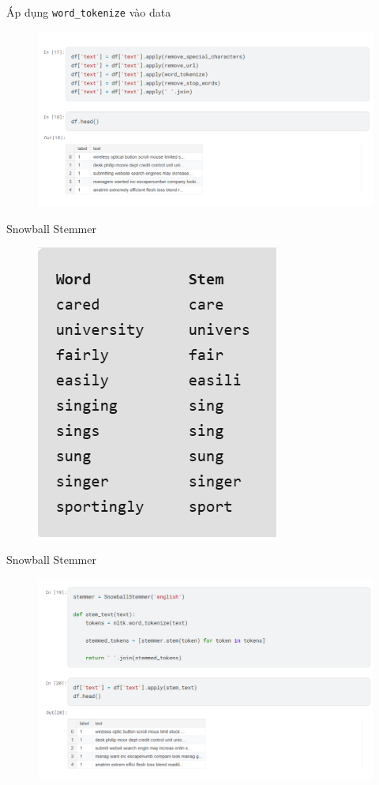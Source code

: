 \documentclass[serif, aspectratio=169]{beamer}
\begin{document}
	\begin{frame}{Áp dụng \texttt{word\_tokenize} vào data}
		\begin{figure}
			\centering
			\includegraphics[width=1\linewidth]{pic/apply-tokenize.png}
			\label{fig:apply-tokenize}
		\end{figure}
	\end{frame}
	
	\begin{frame}{Snowball Stemmer}
		\begin{figure}
			\centering
			\includegraphics[width=0.4\linewidth]{pic/snowball-stemmer.png}
			\label{fig:snowball-stemmer}
		\end{figure}
	\end{frame}
	\begin{frame}{Snowball Stemmer}
		\begin{figure}
			\centering
			\includegraphics[width=0.8\linewidth]{pic/snowball-stemmer-apply.png}
			\label{fig:snowball-stemmer-apply}
		\end{figure}
	\end{frame}
	
\end{document}
